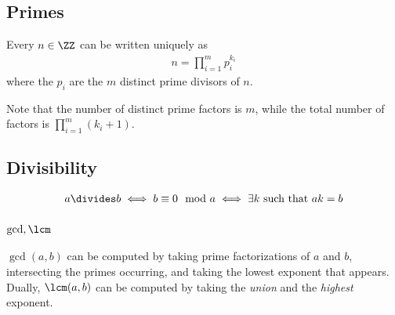 
\hypertarget{primes}{%
\subsection{Primes}\label{primes}}

\begin{theorem}

Every \(n\in \ZZ\) can be written uniquely as
\begin{align*}
n = \prod_{i=1}^m p_i^{k_i}
\end{align*} where the \(p_i\) are the \(m\) distinct prime divisors of
\(n\).

\end{theorem}

\begin{remark}

Note that the number of distinct prime factors is \(m\), while the total
number of factors is \(\prod_{i=1}^m(k_i + 1)\).

\end{remark}

\hypertarget{divisibility}{%
\subsection{Divisibility}\label{divisibility}}

\begin{definition}[Divisibility]

\begin{align*}
a\divides b \iff b \equiv 0 \mod a \iff \exists k \text{ such that } ak = b
\end{align*}

\end{definition}

\hypertarget{gcd-lcm}{%
\subsubsection{\texorpdfstring{\(\gcd, \lcm\)}{\textbackslash gcd, \textbackslash lcm}}\label{gcd-lcm}}

\begin{remark}

\(\gcd(a, b)\) can be computed by taking prime factorizations of \(a\)
and \(b\), intersecting the primes occurring, and taking the lowest
exponent that appears. Dually, \(\lcm(a, b)\) can be computed by taking
the \emph{union} and the \emph{highest} exponent. 

\end{remark}

